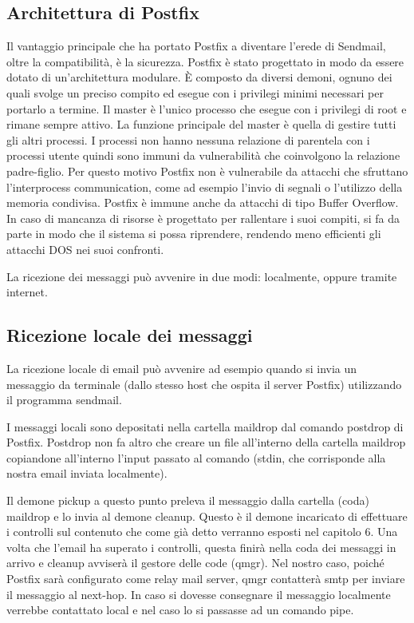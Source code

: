  \subsection{Architettura di Postfix}
  Il vantaggio principale che ha portato Postfix a diventare l’erede di Sendmail, oltre la compatibilità, è la sicurezza. Postfix è stato progettato in modo da essere dotato di un’architettura modulare. È composto da diversi demoni, ognuno dei quali svolge un preciso compito ed esegue con i privilegi minimi necessari per portarlo a termine. Il  master è l’unico processo che esegue con i privilegi di root e rimane sempre attivo. La funzione principale del master è quella di gestire tutti gli altri processi. I processi non hanno nessuna relazione di parentela con i processi utente quindi sono immuni da vulnerabilità che coinvolgono la relazione padre-figlio. Per questo motivo Postfix non è vulnerabile da attacchi che sfruttano l’interprocess communication, come ad esempio l’invio di segnali o l’utilizzo della memoria condivisa. Postfix è immune anche da attacchi di tipo Buffer Overflow. In caso di mancanza di risorse è progettato per rallentare i suoi compiti, si fa da parte in modo che il sistema si possa riprendere, rendendo meno efficienti gli attacchi DOS nei suoi confronti.
  
  La ricezione dei messaggi può avvenire in due modi: localmente, oppure tramite internet.
  \subsection{Ricezione locale dei messaggi}
  La ricezione locale di email può avvenire ad esempio quando si invia un messaggio da terminale (dallo stesso host che ospita il server Postfix) utilizzando il programma sendmail. 
  
  I messaggi locali sono depositati nella cartella maildrop dal comando postdrop di Postfix. Postdrop non fa altro che creare un file all’interno della cartella maildrop copiandone all’interno l’input passato al comando (stdin, che corrisponde alla nostra email inviata localmente). 
  
  Il demone pickup a questo punto preleva il messaggio dalla cartella (coda) maildrop e lo invia al demone cleanup. Questo è il demone incaricato di effettuare i controlli sul contenuto che come già detto verranno esposti nel capitolo 6. Una volta che l’email ha superato i controlli, questa finirà nella coda dei messaggi in arrivo e cleanup avviserà il gestore delle code (qmgr). 
  Nel nostro caso, poiché Postfix sarà configurato come relay mail server, qmgr contatterà smtp per inviare il messaggio al next-hop. In caso si dovesse consegnare il messaggio localmente verrebbe contattato local e nel caso lo si passasse ad un comando pipe.
  
